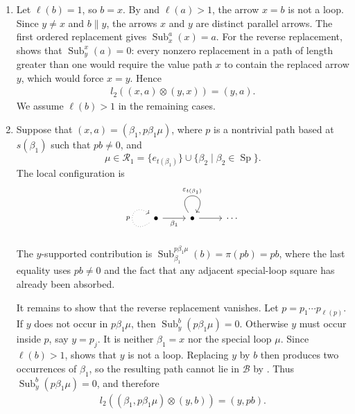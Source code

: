 \documentclass[11pt,a4paper,reqno]{amsart}
\newcommand{\mB}{\mathcal B}
\newcommand{\mR}{\mathcal R}
\newcommand{\Sub}{\operatorname{Sub}}
\newcommand{\Sp}{\operatorname{Sp}}
\newcommand{\para}[2]{(#1,#2)}
\newcommand{\ep}{\varepsilon}
\theoremstyle{plain}
\theoremstyle{definition}
\numberwithin{equation}{section}
\begin{document}
	\begin{enumerate}
		\item Let $\ell(b)=1$, so $b=x$.  By  and $\ell(a)>1$, the
		arrow $x=b$ is not a loop.  Since $y\neq x$ and $b\parallel y$, the
		arrows $x$ and $y$ are distinct parallel arrows.  The first ordered
		replacement gives $\Sub_x^a(x)=a$.  For the reverse replacement,
		 shows that
		$\Sub_y^x(a)=0$: every nonzero replacement in a path of length greater
		than one would require the value path $x$ to contain the replaced arrow
		$y$, which would force $x=y$.  Hence
		\begin{align}
			l_2(\para{x}{a}\otimes\para{y}{x})
			=
			\para{y}{a}.
			\label{eq:xneqy-y-support-only}
		\end{align}
		We assume $\ell(b)>1$ in the remaining cases.
		
		\item Suppose that
		$\para{x}{a}=\para{\beta_1}{p\beta_1\mu}$,
		where $p$ is a nontrivial path based at $s(\beta_1)$ such that $pb\neq0$,
		and
		\[\mu\in\mR_1 = \{e_{t(\beta_1)}\} \cup \{\beta_2\mid\beta_2\in\Sp\}.\]
		The local configuration is
		\[
		\begin{tikzcd}
			\bullet & \bullet & \cdots
			\arrow["p", dotted, from=1-1, to=1-1, loop, in=145, out=215, distance=10mm]
			\arrow["{\beta_1}"', from=1-1, to=1-2]
			\arrow["\ep_{t(\beta_1)}", from=1-2, to=1-2, loop, in=55, out=125, distance=10mm]
			\arrow[from=1-2, to=1-3]
		\end{tikzcd}
		\]
		The $y$-supported contribution is
		$\Sub_{\beta_1}^{p\beta_1\mu}(b)=\pi(pb)=pb$,
		where the last equality uses $pb\neq0$ and the fact that any adjacent
		special-loop square has already been absorbed.
		
		It remains to show that the reverse replacement vanishes.
		Let $p=p_1\cdots p_{\ell(p)}$.
		If $y$ does not occur in
		$p\beta_1\mu$, then $\Sub_y^b(p\beta_1\mu)=0$.  Otherwise $y$ must
		occur inside $p$, say $y=p_j$.  It is neither $\beta_1=x$ nor the
		special loop $\mu$.  Since $\ell(b)>1$,  shows that
		$y$ is not a loop.  Replacing $y$ by $b$ then produces
		two occurrences of $\beta_1$, so the resulting path cannot lie in $\mB$ by
		.  Thus
		$\Sub_y^b(p\beta_1\mu)=0$,
		and therefore
		\begin{align}
			l_2(\para{\beta_1}{p\beta_1\mu}\otimes\para{y}{b})
			=
			\para{y}{pb}.
			\label{eq:xneqy-left-boundary}
		\end{align}
		

\end{enumerate}
\end{document}

